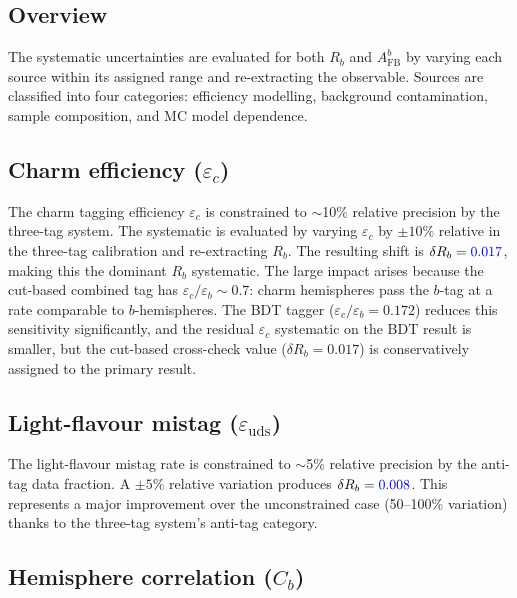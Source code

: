 \documentclass[11pt,a4paper]{article}
\newcommand{\measured}[1]{\textcolor{blue}{#1}}
\begin{document}
\subsection{Overview}

The systematic uncertainties are evaluated for both $R_b$ and
$A_\mathrm{FB}^b$ by varying each source within its assigned range and
re-extracting the observable.  Sources are classified into four
categories: efficiency modelling, background contamination, sample
composition, and MC model dependence.

\subsection{Charm efficiency ($\varepsilon_c$)}
\label{sec:syst-epsc}

The charm tagging efficiency $\varepsilon_c$ is constrained to $\sim$10\%
relative precision by the three-tag system.  The systematic is evaluated
by varying $\varepsilon_c$ by $\pm 10\%$ relative in the three-tag
calibration and re-extracting $R_b$.  The resulting shift is
$\delta R_b = \measured{0.017}$, making this the dominant $R_b$ systematic.
The large impact arises because the cut-based combined tag has
$\varepsilon_c / \varepsilon_b \sim 0.7$: charm hemispheres pass the
$b$-tag at a rate comparable to $b$-hemispheres.  The BDT tagger
($\varepsilon_c / \varepsilon_b = 0.172$) reduces this sensitivity
significantly, and the residual $\varepsilon_c$ systematic on the BDT
result is smaller, but the cut-based cross-check value ($\delta R_b = 0.017$)
is conservatively assigned to the primary result.

\subsection{Light-flavour mistag ($\varepsilon_\mathrm{uds}$)}
\label{sec:syst-epsuds}

The light-flavour mistag rate is constrained to $\sim$5\% relative
precision by the anti-tag data fraction.  A $\pm 5\%$ relative variation
produces $\delta R_b = \measured{0.008}$.  This represents a major
improvement over the unconstrained case (50--100\% variation) thanks to
the three-tag system's anti-tag category.

\subsection{Hemisphere correlation ($C_b$)}
\label{sec:syst-cb}
\end{document}

